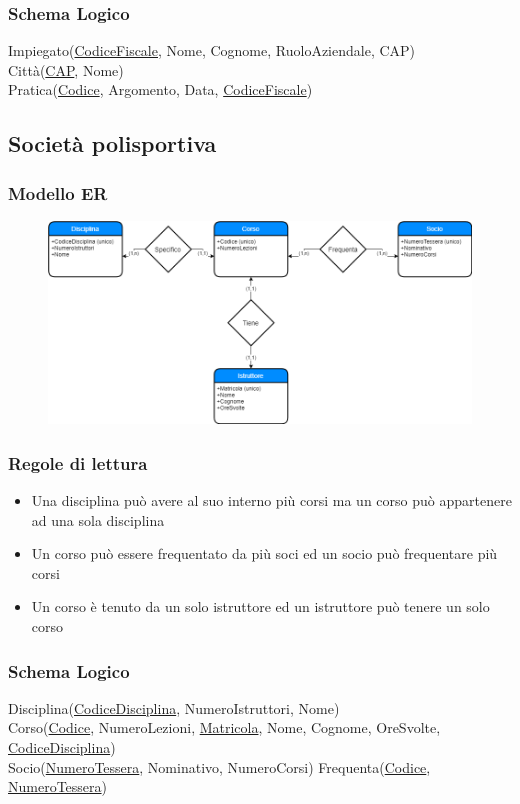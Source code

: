\documentclass{article}
\begin{document}
	\subsubsection{Schema Logico}
	Impiegato(\underline{CodiceFiscale}, Nome, Cognome, RuoloAziendale, CAP)\\
	Città(\underline{CAP}, Nome)\\
	Pratica(\underline{Codice}, Argomento, Data, \underline{CodiceFiscale})

	\pagebreak
	
	\subsection{Società polisportiva}
	\subsubsection{Modello ER}
	\begin{figure}[h!]
		\centering
		\includegraphics[scale=0.5]{images/Palestra.png}
	\end{figure}
	\subsubsection{Regole di lettura}
	\begin{itemize}
		\item Una disciplina può avere al suo interno più corsi ma un corso può appartenere ad una sola disciplina
		\item Un corso può essere frequentato da più soci ed un socio può frequentare più corsi
		\item Un corso è tenuto da un solo istruttore ed un istruttore può tenere un solo corso
	\end{itemize}
	\subsubsection{Schema Logico}
	Disciplina(\underline{CodiceDisciplina}, NumeroIstruttori, Nome)\\
	Corso(\underline{Codice}, NumeroLezioni, \underline{Matricola}, Nome, Cognome, OreSvolte, \underline{CodiceDisciplina})\\
	Socio(\underline{NumeroTessera}, Nominativo, NumeroCorsi)
	Frequenta(\underline{Codice}, \underline{NumeroTessera})
\end{document}
